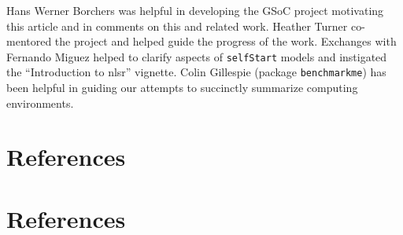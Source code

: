 Hans Werner Borchers was helpful in developing the GSoC project motivating this article
and in comments on this and related work. Heather Turner co-mentored the project
and helped guide the progress of the work. Exchanges with Fernando Miguez helped to
clarify aspects of \texttt{selfStart} models and instigated the ``Introduction to nlsr''
vignette. Colin Gillespie (package \texttt{benchmarkme}) has been helpful in guiding our
attempts to succinctly summarize computing environments.

\hypertarget{references}{%
\section{References}\label{references}}

\hypertarget{references-1}{%
\section*{References}\label{references-1}}

